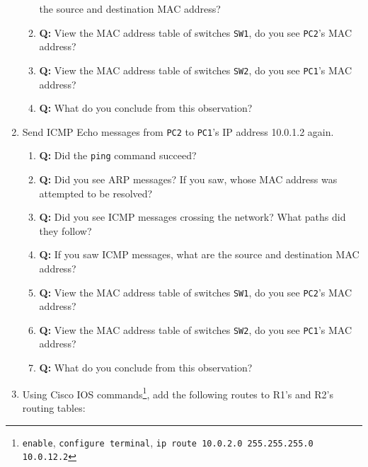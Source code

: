 \documentclass[pdftex,12pt,a4paper]{article}
\begin{document}
\begin{enumerate}
\begin{enumerate}
                            the source and destination MAC address?
                        \item \textbf{Q:} View the MAC address table of
                            switches \texttt{SW1}, do you see \texttt{PC2}'s MAC address?
                        \item \textbf{Q:} View the MAC address table of
                            switches \texttt{SW2}, do you see \texttt{PC1}'s MAC address?
                        \item \textbf{Q:} What do you conclude from this observation?
                    \end{enumerate}
                \item Send ICMP Echo messages from \texttt{PC2} to \texttt{PC1}'s IP address
                    10.0.1.2 again.
                    \begin{enumerate}
                        \item \textbf{Q:} Did the \texttt{ping} command succeed?
                        \item \textbf{Q:} Did you see ARP messages? If you saw, whose
                            MAC address was attempted to be resolved?
                        \item \textbf{Q:} Did you see ICMP messages crossing the
                            network? What paths did they follow?
                        \item \textbf{Q:} If you saw ICMP messages, what are
                            the source and destination MAC address?
                        \item \textbf{Q:} View the MAC address table of
                            switches \texttt{SW1}, do you see \texttt{PC2}'s MAC address?
                        \item \textbf{Q:} View the MAC address table of
                            switches \texttt{SW2}, do you see \texttt{PC1}'s MAC address?
                        \item \textbf{Q:} What do you conclude from this observation?
                    \end{enumerate}
                \item Using Cisco IOS commands\footnote{\texttt{enable},
                        \texttt{configure terminal}, \texttt{ip route 10.0.2.0
                    255.255.255.0 10.0.12.2}}, add the following
                    routes to R1's and R2's routing tables:
                    \begin{itemize}

\end{itemize}
\end{enumerate}
\end{document}

